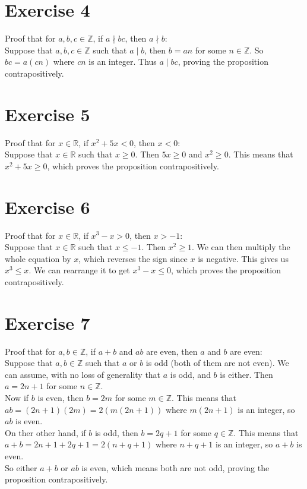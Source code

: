 \documentclass[12pt]{article}
\newcommand{\Z}{\mathbb{Z}}
\newcommand{\R}{\mathbb{R}}
\begin{document}
    \section*{Exercise 4}
    Proof that for $a, b, c \in \Z$,
    if $a \nmid bc$,
    then $a \nmid b$: \\
    Suppose that $a, b, c \in \Z$
    such that $a \mid b$,
    then $b = an$ for some $n \in \Z$.
    So $bc = a(cn)$ where $cn$ is an integer.
    Thus $a \mid bc$,
    proving the proposition contrapositively. \\

    \section*{Exercise 5}
    Proof that for $x \in \R$,
    if $x^2 + 5x < 0$,
    then $x < 0$: \\
    Suppose that $x \in \R$
    such that $x \geqslant 0$.
    Then $5x \geqslant 0$ and $x^2 \geqslant 0$.
    This means that $x^2 + 5x \geqslant 0$,
    which proves the proposition contrapositively. \\

    \section*{Exercise 6}
    Proof that for $x \in \R$,
    if $x^3 - x > 0$,
    then $x > -1$: \\
    Suppose that $x \in \R$
    such that $x \leqslant -1$.
    Then $x^2\geqslant 1$.
    We can then multiply the whole equation by $x$,
    which reverses the sign since $x$ is negative.
    This gives us $x^3 \leqslant x$.
    We can rearrange it to get $x^3 - x \leqslant 0$,
    which proves the proposition contrapositively. \\

    \section*{Exercise 7}
    Proof that for $a, b \in \Z$,
    if $a + b$ and $ab$ are even,
    then $a$ and $b$ are even: \\
    Suppose that $a, b \in \Z$
    such that $a$ or $b$ is odd
    (both of them are not even).
    We can assume, with no loss of generality
    that $a$ is odd, and $b$ is either.
    Then $a = 2n+1$ for some $n \in \Z$. \\
    Now if $b$ is even,
    then $b = 2m$ for some $m \in \Z$. 
    This means that $ab = (2n+1)(2m) = 2(m(2n+1))$
    where $m(2n+1)$ is an integer,
    so $ab$ is even. \\
    On ther other hand, if $b$ is odd,
    then $b = 2q + 1$ for some $q \in \Z$. 
    This means that $a + b = 2n+1 + 2q+1 = 2(n + q + 1)$
    where $n + q + 1$ is an integer,
    so $a + b$ is even. \\
    So either $a+b$ or $ab$ is even,
    which means both are not odd,
    proving the proposition contrapositively. \\
\end{document}

